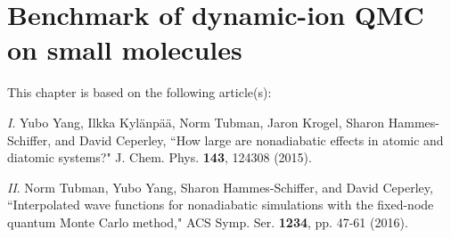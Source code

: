 \chapter{Benchmark of dynamic-ion QMC on small molecules}
This chapter is based on the following article(s):

\textit{I}. Yubo Yang, Ilkka Kyl\"anp\"a\"a, Norm Tubman, Jaron Krogel, Sharon Hammes-Schiffer, and David Ceperley, ``How large are nonadiabatic effects in atomic and diatomic systems?" J. Chem. Phys. \textbf{143}, 124308 (2015).

\textit{II}. Norm Tubman, Yubo Yang, Sharon Hammes-Schiffer, and David Ceperley, ``Interpolated wave functions for nonadiabatic simulations with the fixed-node quantum Monte Carlo method," ACS Symp. Ser. \textbf{1234}, pp. 47-61 (2016).


